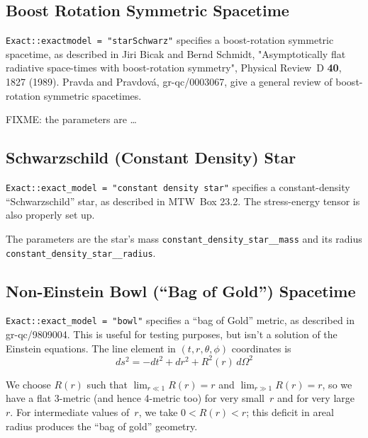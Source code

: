 
\subsection{Boost Rotation Symmetric Spacetime}

\verb|Exact::exactmodel = "starSchwarz"| specifies a boost-rotation
symmetric spacetime, as described in Jiri Bicak and Bernd Schmidt,
"Asymptotically flat radiative space-times with boost-rotation symmetry",
Physical Review~D {\bf 40}, 1827 (1989).
Pravda and Pravdov\'{a}, gr-qc/0003067, give a
general review of boost-rotation symmetric spacetimes.  

FIXME: the parameters are \dots


\subsection{Schwarzschild (Constant Density) Star}

\verb|Exact::exact_model = "constant density star"| specifies a
constant-density ``Schwarzschild'' star, as described in MTW~Box 23.2.
The stress-energy tensor is also properly set up.

The parameters are the star's mass \verb|constant_density_star__mass|
and its radius \verb|constant_density_star__radius|.


\subsection{Non-Einstein Bowl (``Bag of Gold'') Spacetime}

\verb|Exact::exact_model = "bowl"| specifies a ``bag of Gold'' metric,
as described in gr-qc/9809004.  This is useful for testing purposes,
but isn't a solution of the Einstein equations.
The line element in $(t,r,\theta,\phi)$ coordinates is
\begin{equation}
ds^2 = -dt^2 + dr^2 + R^2(r) \, d\Omega^2
\end{equation}

We choose $R(r)$ such that $\displaystyle \lim_{r \ll 1} R(r) = r$
and $\displaystyle \lim_{r \gg 1} R(r) = r$, so we have a flat 3-metric
(and hence 4-metric too) for very small~$r$ and for very large~$r$.
For intermediate values of~$r$, we take $0 < R(r) < r$; this deficit
in areal radius produces the ``bag of gold'' geometry.

